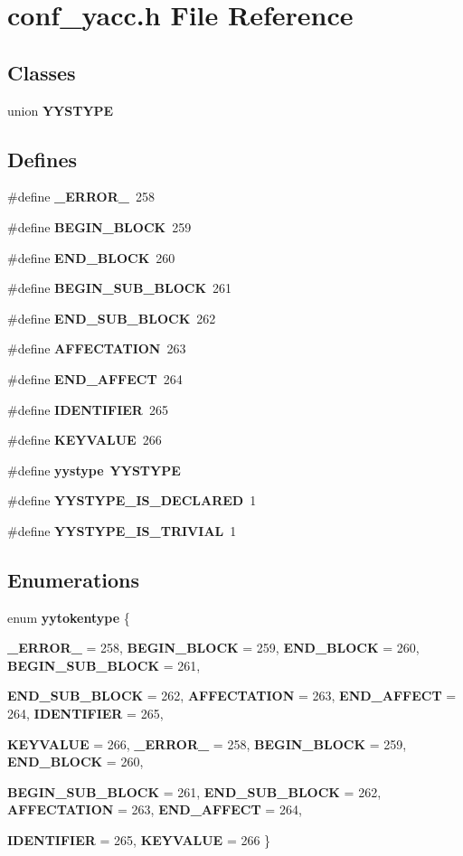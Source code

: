 \section{conf\_\-yacc.h File Reference}
\label{conf__yacc_8h}
\subsection*{Classes}
\begin{CompactItemize}
\item 
union {\bf YYSTYPE}
\end{CompactItemize}
\subsection*{Defines}
\begin{CompactItemize}
\item 
\#define {\bf \_\-ERROR\_\-}~258
\item 
\#define {\bf BEGIN\_\-BLOCK}~259
\item 
\#define {\bf END\_\-BLOCK}~260
\item 
\#define {\bf BEGIN\_\-SUB\_\-BLOCK}~261
\item 
\#define {\bf END\_\-SUB\_\-BLOCK}~262
\item 
\#define {\bf AFFECTATION}~263
\item 
\#define {\bf END\_\-AFFECT}~264
\item 
\#define {\bf IDENTIFIER}~265
\item 
\#define {\bf KEYVALUE}~266
\item 
\#define {\bf yystype}~{\bf YYSTYPE}
\item 
\#define {\bf YYSTYPE\_\-IS\_\-DECLARED}~1
\item 
\#define {\bf YYSTYPE\_\-IS\_\-TRIVIAL}~1
\end{CompactItemize}
\subsection*{Enumerations}
\begin{CompactItemize}
\item 
enum {\bf yytokentype} \{ \par
{\bf \_\-ERROR\_\-} =  258, 
{\bf BEGIN\_\-BLOCK} =  259, 
{\bf END\_\-BLOCK} =  260, 
{\bf BEGIN\_\-SUB\_\-BLOCK} =  261, 
\par
{\bf END\_\-SUB\_\-BLOCK} =  262, 
{\bf AFFECTATION} =  263, 
{\bf END\_\-AFFECT} =  264, 
{\bf IDENTIFIER} =  265, 
\par
{\bf KEYVALUE} =  266, 
{\bf \_\-ERROR\_\-} =  258, 
{\bf BEGIN\_\-BLOCK} =  259, 
{\bf END\_\-BLOCK} =  260, 
\par
{\bf BEGIN\_\-SUB\_\-BLOCK} =  261, 
{\bf END\_\-SUB\_\-BLOCK} =  262, 
{\bf AFFECTATION} =  263, 
{\bf END\_\-AFFECT} =  264, 
\par
{\bf IDENTIFIER} =  265, 
{\bf KEYVALUE} =  266
 \}
\end{CompactItemize}
